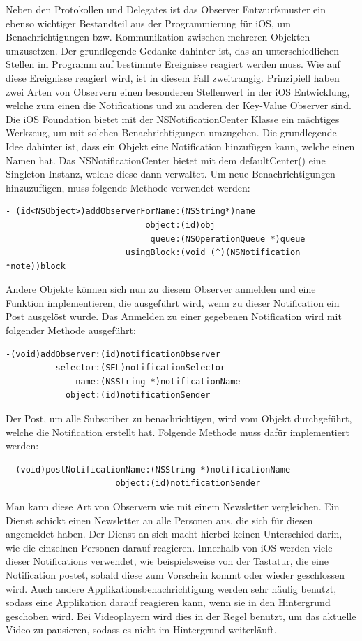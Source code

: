 \documentclass[11pt,a4paper]{report}
\begin{document}
Neben den Protokollen und Delegates ist das Observer Entwurfsmuster ein ebenso wichtiger Bestandteil aus der Programmierung für iOS, um Benachrichtigungen bzw. Kommunikation zwischen mehreren Objekten umzusetzen. Der grundlegende Gedanke dahinter ist, das an unterschiedlichen Stellen im Programm auf bestimmte Ereignisse reagiert werden muss. Wie auf diese Ereignisse reagiert wird, ist in diesem Fall zweitrangig. Prinzipiell haben zwei Arten von Observern einen besonderen Stellenwert in der iOS Entwicklung, welche zum einen die Notifications und zu anderen der Key-Value Observer sind. Die iOS Foundation bietet mit der NSNotificationCenter Klasse ein mächtiges Werkzeug, um mit solchen Benachrichtigungen umzugehen. Die grundlegende Idee dahinter ist, dass ein Objekt eine Notification hinzufügen kann, welche einen Namen hat. Das NSNotificationCenter bietet mit dem defaultCenter() eine Singleton Instanz, welche diese dann verwaltet. Um neue Benachrichtigungen hinzuzufügen, muss folgende Methode verwendet werden:
\begin{lstlisting}
- (id<NSObject>)addObserverForName:(NSString*)name
                            object:(id)obj
                             queue:(NSOperationQueue *)queue
                        usingBlock:(void (^)(NSNotification *note))block
\end{lstlisting}
Andere Objekte können sich nun zu diesem Observer anmelden und eine Funktion implementieren, die ausgeführt wird, wenn zu dieser Notification ein Post ausgelöst wurde. Das Anmelden zu einer gegebenen Notification wird mit folgender Methode ausgeführt:
\begin{lstlisting}
-(void)addObserver:(id)notificationObserver
          selector:(SEL)notificationSelector
              name:(NSString *)notificationName
            object:(id)notificationSender
\end{lstlisting}
Der Post, um alle Subscriber zu benachrichtigen, wird vom Objekt durchgeführt, welche die Notification erstellt hat. Folgende Methode muss dafür implementiert werden:
\begin{lstlisting}
- (void)postNotificationName:(NSString *)notificationName
                      object:(id)notificationSender
\end{lstlisting}
Man kann diese Art von Observern wie mit einem Newsletter vergleichen. Ein Dienst schickt einen Newsletter an alle Personen aus, die sich für diesen angemeldet haben. Der Dienst an sich macht hierbei keinen Unterschied darin, wie die einzelnen Personen darauf reagieren. Innerhalb von iOS werden viele dieser Notifications verwendet, wie beispielsweise von der Tastatur, die eine Notification postet, sobald diese zum Vorschein kommt oder wieder geschlossen wird. Auch andere Applikationsbenachrichtigung werden sehr häufig benutzt, sodass eine Applikation darauf reagieren kann, wenn sie in den Hintergrund geschoben wird. Bei Videoplayern wird dies in der Regel benutzt, um das aktuelle Video zu pausieren, sodass es nicht im Hintergrund weiterläuft. \cite{NSNotificationCenterClass} \cite{chung2011pro}
\end{document}
